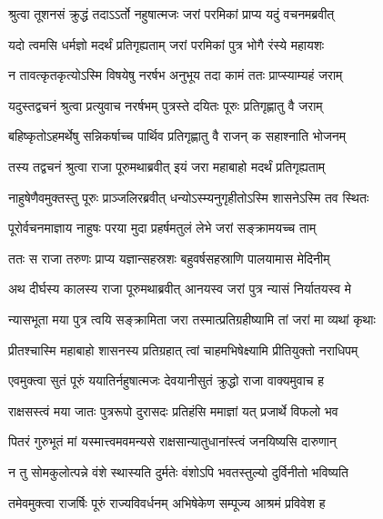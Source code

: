 
\twolineshloka
{श्रुत्वा तूशनसं क्रुद्धं तदाऽऽर्तो नहुषात्मजः}
{जरां परमिकां प्राप्य यदुं वचनमब्रवीत्} %

\twolineshloka
{यदो त्वमसि धर्मज्ञो मदर्थं प्रतिगृह्यताम्}
{जरां परमिकां पुत्र भोगै रंस्ये महायशः} %

\twolineshloka
{न तावत्कृतकृत्योऽस्मि विषयेषु नरर्षभ}
{अनुभूय तदा कामं ततः प्राप्स्याम्यहं जराम्} %

\twolineshloka
{यदुस्तद्वचनं श्रुत्वा प्रत्युवाच नरर्षभम्}
{पुत्रस्ते दयितः पूरुः प्रतिगृह्णातु वै जराम्} %

\twolineshloka
{बहिष्कृतोऽहमर्थेषु सन्निकर्षाच्च पार्थिव}
{प्रतिगृह्णातु वै राजन् क सहाश्नाति भोजनम्} %

\twolineshloka
{तस्य तद्वचनं श्रुत्वा राजा पूरुमथाब्रवीत्}
{इयं जरा महाबाहो मदर्थं प्रतिगृह्यताम्} %

\twolineshloka
{नाहुषेणैवमुक्तस्तु पूरुः प्राञ्जलिरब्रवीत्}
{धन्योऽस्म्यनुगृहीतोऽस्मि शासनेऽस्मि तव स्थितः} %

\twolineshloka
{पूरोर्वचनमाज्ञाय नाहुषः परया मुदा}
{प्रहर्षमतुलं लेभे जरां सङ्क्रामयच्च ताम्} %

\twolineshloka
{ततः स राजा तरुणः प्राप्य यज्ञान्सहस्रशः}
{बहुवर्षसहस्राणि पालयामास मेदिनीम्} %

\twolineshloka
{अथ दीर्घस्य कालस्य राजा पूरुमथाब्रवीत्}
{आनयस्व जरां पुत्र न्यासं निर्यातयस्व मे} %

\twolineshloka
{न्यासभूता मया पुत्र त्वयि सङ्क्रामिता जरा}
{तस्मात्प्रतिग्रहीष्यामि तां जरां मा व्यथां कृथाः} %

\twolineshloka
{प्रीतश्चास्मि महाबाहो शासनस्य प्रतिग्रहात्}
{त्वां चाहमभिषेक्ष्यामि प्रीतियुक्तो नराधिपम्} %

\twolineshloka
{एवमुक्त्वा सुतं पूरुं ययातिर्नहुषात्मजः}
{देवयानीसुतं क्रुद्धो राजा वाक्यमुवाच ह} %

\twolineshloka
{राक्षसस्त्वं मया जातः पुत्ररूपो दुरासदः}
{प्रतिहंसि ममाज्ञां यत् प्रजार्थे विफलो भव} %

\twolineshloka
{पितरं गुरुभूतं मां यस्मात्त्वमवमन्यसे}
{राक्षसान्यातुधानांस्त्वं जनयिष्यसि दारुणान्} %

\twolineshloka
{न तु सोमकुलोत्पन्ने वंशे स्थास्यति दुर्मतेः}
{वंशोऽपि भवतस्तुल्यो दुर्विनीतो भविष्यति} %

\twolineshloka
{तमेवमुक्त्वा राजर्षिः पूरुं राज्यविवर्धनम्}
{अभिषेकेण सम्पूज्य आश्रमं प्रविवेश ह} %

